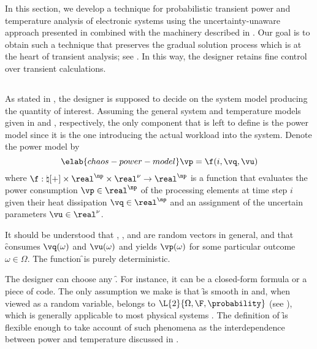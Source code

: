 In this section, we develop a technique for probabilistic transient power and
temperature analysis of electronic systems using the uncertainty-unaware
approach presented in  combined with the machinery
described in . Our goal is to obtain such a
technique that preserves the gradual solution process which is at the heart of
transient analysis; see . In this way, the designer
retains fine control over transient calculations.

\subsection{\problemtitle}

As stated in , the designer is supposed to
decide on the system model producing the quantity of interest. Assuming the
general system and temperature models given in  and
, respectively, the only component that is left to
define is the power model since it is the one introducing the actual workload
into the system. Denote the power model by
\begin{equation} \elab{chaos-power-model}
  \vp = \f(i, \vq, \vu)
\end{equation}
where $\f: \natural[+] \times \real^\np \times \real^\nu \to \real^\np$ is a
function that evaluates the power consumption $\vp \in \real^\np$ of the
processing elements at time step $i$ given their heat dissipation $\vq \in
\real^\np$ and an assignment of the uncertain parameters $\vu \in \real^\nu$.

\begin{remark}
It should be understood that \vp, \vq, and \vu are random vectors in general,
and that \f consumes $\vq(\omega)$ and $\vu(\omega)$ and yields $\vp(\omega)$
for some particular outcome $\omega \in \Omega$. The function \f \perse is
purely deterministic.
\end{remark}

The designer can choose any \f. For instance, it can be a closed-form formula or
a piece of code. The only assumption we make is that \f is smooth in \vz and,
when viewed as a random variable, belongs to $\L{2}{\Omega, \F, \probability}$
(see ), which is generally applicable to most physical
systems \cite{xiu2010}. The definition of \f is flexible enough to take account
of such phenomena as the interdependence between power and temperature discussed
in .

